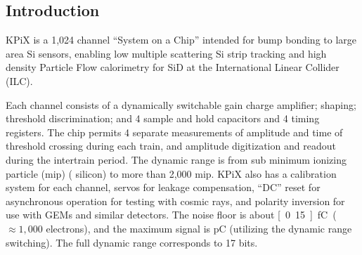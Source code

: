 
\subsection{Introduction}
KPiX is a 1,024 channel ``System on a Chip'' intended for bump bonding to large area Si sensors, enabling low multiple scattering Si strip tracking and high density Particle Flow calorimetry for SiD at the International Linear Collider (ILC).

Each channel consists of a dynamically switchable gain charge amplifier; shaping; threshold discrimination; and 4 sample and hold capacitors and 4 timing registers. The chip permits 4 separate measurements of amplitude and time of threshold crossing during each train, and amplitude digitization and readout during the intertrain period. The dynamic range is from sub minimum ionizing particle (mip) (\unit[320]{\micron} silicon) to more than 2,000 mip. KPiX also has a calibration system for each channel, servos for leakage compensation, ``DC'' reset for asynchronous operation for testing with cosmic rays, and polarity inversion for use with GEMs and similar detectors. The noise floor is about \unit[0.15]{fC} ($\approx 1,000$ electrons), and the maximum signal is \unit[10]{pC} (utilizing the dynamic range switching). The full dynamic range corresponds to 17 bits.

